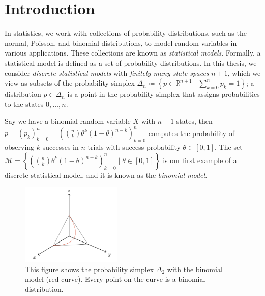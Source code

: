 \chapter{Introduction} 

In statistics, we work with collections of probability distributions, such as the normal, Poisson, and binomial distributions, to model random variables in various applications. These collections are known as \emph{statistical models}. Formally, a statistical model is defined as a set of probability distributions. In this thesis, we consider \emph{discrete statistical models} with \emph{finitely many state spaces} \( n + 1 \), which we view as subsets of the probability simplex \( \Delta_n \coloneqq \left\{ p \in \mathbb{R}^{n + 1} \mid \sum_{k=0}^n p_k = 1 \right\} \); a distribution \( p \in \Delta_n \) is a point in the probability simplex that assigns probabilities to the states \( 0, \dots, n \).
 
\begin{example}
Say we have a binomial random variable \( X \) with \( n + 1 \) states, then \( p = (p_k)_{k=0}^n = (\binom{n}{k} \theta^k (1-\theta)^{n-k})_{k=0}^n \) computes the probability of observing \( k \) successes in \( n \) trials with success probability \( \theta \in [0,1] \). The set \( \mathcal{M} = \left\{ (\binom{n}{k} \theta^k (1-\theta)^{n-k})_{k=0}^n \mid \theta \in [0,1] \right\} \) is our first example of a discrete statistical model, and it is known as the \emph{binomial model}.

\begin{figure}[H]
    \centering
    \includegraphics[width=0.43\textwidth]{assets/binom-discrete-model.png}
    \caption{This figure shows the probability simplex \( \Delta_2 \) with the binomial model (red curve). Every point on the curve is a binomial distribution.}
    \label{fig:binom-discrete-model}
\end{figure}
\end{example}

